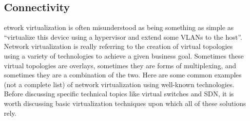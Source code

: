 \subsection{Connectivity}
etwork virtualization is often misunderstood as being something as simple as
``virtualize this device using a hypervisor and extend some VLANs to the host''.
Network virtualization is really referring to the creation of virtual
topologies using a variety of technologies to achieve a given business goal.
Sometimes these virtual topologies are overlays, sometimes they are forms of
multiplexing, and sometimes they are a combination of the two. Here are some
common examples (not a complete list) of network virtualization using
well-known technologies. Before discussing specific technical topics like
virtual switches and SDN, it is worth discussing basic virtualization
techniques upon which all of these solutions rely.

